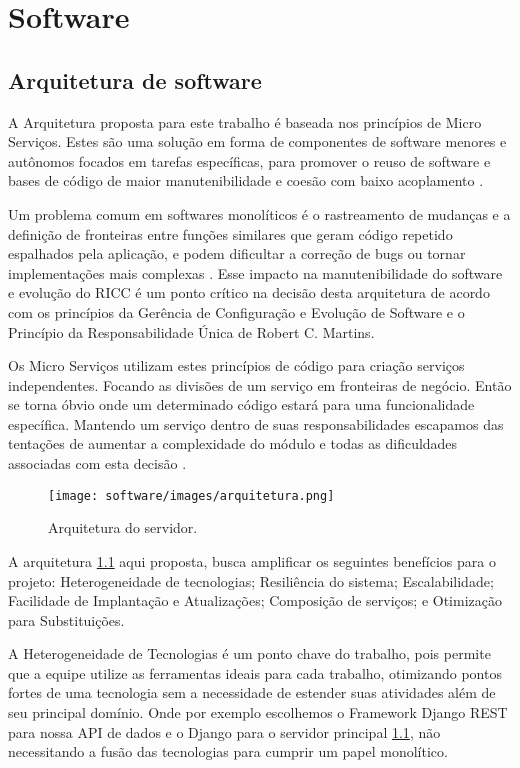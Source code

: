 \chapter[Software]{Software}
    \section{Arquitetura de software}


    A Arquitetura proposta para este trabalho é baseada nos princípios de Micro Serviços. Estes são uma solução em forma de componentes de software menores e autônomos focados em tarefas específicas, para promover o reuso de software e bases de código de maior manutenibilidade e coesão com baixo acoplamento \cite{newman_2018}.

    Um problema comum em softwares monolíticos é o rastreamento de mudanças e a definição de fronteiras entre funções similares que geram código repetido espalhados pela aplicação, e podem dificultar a correção de bugs ou tornar implementações mais complexas \cite{newman_2018}. Esse impacto na manutenibilidade do software e evolução do RICC é um ponto crítico na decisão desta arquitetura de acordo com os princípios da Gerência de Configuração e Evolução de Software \cite{gces} e o Princípio da Responsabilidade Única de Robert C. Martins.

    Os Micro Serviços utilizam estes princípios de código para criação serviços independentes. Focando as divisões de um serviço em fronteiras de negócio. Então se torna óbvio onde um determinado código estará para uma funcionalidade específica. Mantendo um serviço dentro de suas responsabilidades escapamos das tentações de aumentar a complexidade do módulo e todas as dificuldades associadas com esta decisão \cite{newman_2018}.

    \begin{figure}[H]
        \texttt{[image: software/images/arquitetura.png]}
        \caption{Arquitetura do servidor.}
        \label{fig:arquitetura}
    \end{figure}

    A arquitetura \ref{fig:arquitetura} aqui proposta, busca amplificar os seguintes benefícios para o projeto: Heterogeneidade de tecnologias; Resiliência do sistema; Escalabilidade; Facilidade de Implantação e Atualizações; Composição de serviços; e Otimização para Substituições.

    A Heterogeneidade de Tecnologias é um ponto chave do trabalho, pois permite que a equipe utilize as ferramentas ideais para cada trabalho, otimizando pontos fortes de uma tecnologia sem a necessidade de estender suas atividades além de seu principal domínio. Onde por exemplo escolhemos o Framework Django REST para nossa API de dados e o Django para o servidor principal \ref{fig:arquitetura}, não necessitando a fusão das tecnologias para cumprir um papel monolítico.

